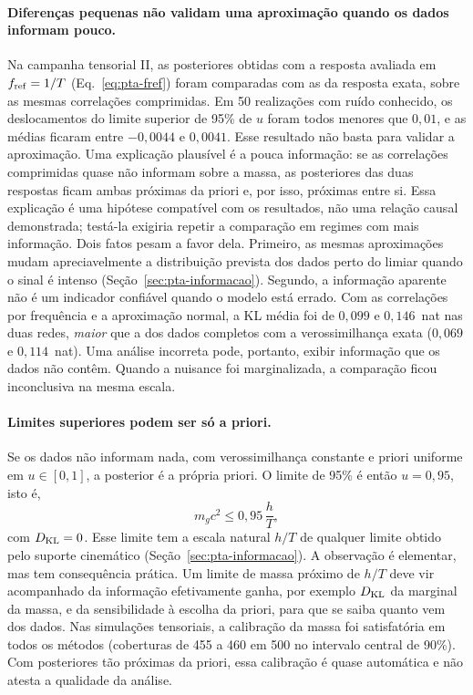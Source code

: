 \paragraph{Diferenças pequenas não validam uma aproximação quando os
dados informam pouco.} Na campanha tensorial II, as posteriores obtidas com a resposta
avaliada em $f_{\rm ref}=1/T$ (Eq.~\ref{eq:pta-fref}) foram comparadas
com as da resposta exata, sobre as mesmas correlações comprimidas. Em
50 realizações com ruído conhecido, os deslocamentos do limite superior
de 95\% de $u$ foram todos menores que $0{,}01$, e as médias ficaram
entre $-0{,}0044$ e $0{,}0041$. Esse resultado não basta para validar a
aproximação. Uma explicação plausível é a pouca informação: se as
correlações comprimidas quase não informam sobre a massa, as posteriores
das duas respostas ficam ambas próximas da priori e, por isso, próximas
entre si. Essa explicação é uma hipótese compatível com os resultados,
não uma relação causal demonstrada; testá-la exigiria repetir a
comparação em regimes com mais informação. Dois fatos pesam a favor dela.
Primeiro, as mesmas aproximações mudam apreciavelmente a distribuição
prevista dos dados perto do limiar quando o sinal é intenso
(Seção~\ref{sec:pta-informacao}). Segundo, a informação aparente não é
um indicador confiável quando o modelo está errado. Com as correlações
por frequência e a aproximação normal, a KL média foi de $0{,}099$ e
$0{,}146$~nat nas duas redes, \emph{maior} que a dos dados completos com a
verossimilhança exata ($0{,}069$ e $0{,}114$~nat). Uma análise incorreta
pode, portanto, exibir informação que os dados não contêm. Quando a
nuisance foi marginalizada, a comparação ficou inconclusiva na mesma
escala.

\paragraph{Limites superiores podem ser só a priori.} Se os dados não
informam nada, com verossimilhança constante e priori uniforme em
$u\in[0,1]$, a posterior é a própria priori. O limite de 95\% é então
$u=0{,}95$, isto é,
\begin{equation}
 m_gc^2\leq0{,}95\,\frac{h}{T},
 \label{eq:sim-priori}
\end{equation}
com $D_{\rm KL}=0$. Esse limite tem a escala natural $h/T$ de qualquer
limite obtido pelo suporte cinemático (Seção~\ref{sec:pta-informacao}).
A observação é elementar, mas tem consequência prática. Um limite de
massa próximo de $h/T$ deve vir acompanhado da informação efetivamente
ganha, por exemplo $D_{\rm KL}$ da marginal da massa, e da sensibilidade
à escolha da priori, para que se saiba quanto vem dos dados. Nas
simulações tensoriais, a calibração da massa foi satisfatória em todos
os métodos (coberturas de 455 a 460 em 500 no intervalo central de
90\%). Com posteriores tão próximas da priori, essa calibração é quase
automática e não atesta a qualidade da análise.

